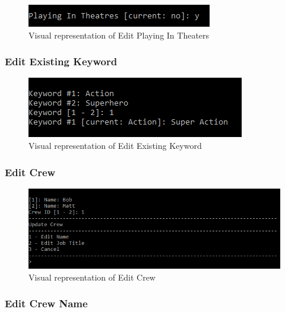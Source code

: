 \documentclass[
  english,
  a4paper,
,tablecaptionabove
]{scrartcl}
\begin{document}
\begin{figure}
\centering
\includegraphics{images/ui-screenshots/update-playing-in-theatres.png}
\caption{Visual representation of Edit Playing In Theaters}
\end{figure}

\newpage

\hypertarget{edit-existing-keyword}{%
\subsubsection{Edit Existing Keyword}\label{edit-existing-keyword}}

\begin{figure}
\centering
\includegraphics{images/ui-screenshots/update-existing-keyword.png}
\caption{Visual representation of Edit Existing Keyword}
\end{figure}

\newpage

\hypertarget{edit-crew}{%
\subsubsection{Edit Crew}\label{edit-crew}}

\begin{figure}
\centering
\includegraphics{images/ui-screenshots/update-crew.png}
\caption{Visual representation of Edit Crew}
\end{figure}

\newpage

\hypertarget{edit-crew-name}{%
\subsubsection{Edit Crew Name}\label{edit-crew-name}}
\end{document}
